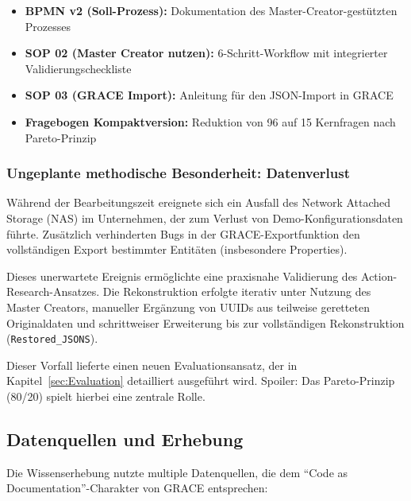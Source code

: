 \begin{itemize}
    \item \textbf{BPMN v2 (Soll-Prozess):} Dokumentation des Master-Creator-gestützten Prozesses
    \item \textbf{SOP 02 (Master Creator nutzen):} 6-Schritt-Workflow mit integrierter Validierungscheckliste
    \item \textbf{SOP 03 (GRACE Import):} Anleitung für den JSON-Import in GRACE
    \item \textbf{Fragebogen Kompaktversion:} Reduktion von 96 auf 15 Kernfragen nach Pareto-Prinzip
\end{itemize}


\subsubsection{Ungeplante methodische Besonderheit: Datenverlust}
\label{subsubsec:NASCrashValidierung}

Während der Bearbeitungszeit ereignete sich ein Ausfall des Network Attached Storage (NAS) im Unternehmen, der zum Verlust von Demo-Konfigurationsdaten führte. Zusätzlich verhinderten Bugs in der GRACE-Exportfunktion den vollständigen Export bestimmter Entitäten (insbesondere Properties).

Dieses unerwartete Ereignis ermöglichte eine praxisnahe Validierung des Action-Research-Ansatzes. Die Rekonstruktion erfolgte iterativ unter Nutzung des Master Creators, manueller Ergänzung von UUIDs aus teilweise geretteten Originaldaten und schrittweiser Erweiterung bis zur vollständigen Rekonstruktion (\texttt{Restored\_JSONS}).

Dieser Vorfall lieferte einen neuen Evaluationsansatz, der in Kapitel~\ref{sec:Evaluation} detailliert ausgeführt wird. Spoiler: Das Pareto-Prinzip (80/20) spielt hierbei eine zentrale Rolle.


\subsection{Datenquellen und Erhebung}
\label{subsec:Datenquellen}

Die Wissenserhebung nutzte multiple Datenquellen, die dem ``Code as Documentation''-Charakter von GRACE entsprechen:


